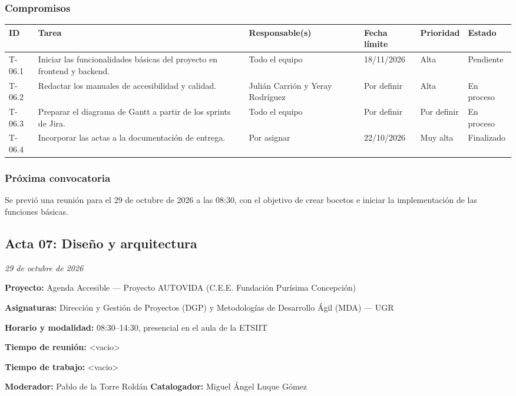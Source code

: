 \subsubsection{Compromisos}
\begin{center}\footnotesize
\begin{tabularx}{\textwidth}{@{}p{}X p{}p{}p{}p{}@{}}
\toprule
\rowcolor{tableHeader} ID & Tarea & Responsable(s) & Fecha límite & Prioridad & Estado \\
\midrule
T-06.1 & Iniciar las funcionalidades básicas del proyecto en frontend y backend. & Todo el equipo & 18/11/2026 & Alta & Pendiente \\
T-06.2 & Redactar los manuales de accesibilidad y calidad. & Julián Carrión y Yeray Rodríguez & Por definir & Alta & En proceso \\
T-06.3 & Preparar el diagrama de Gantt a partir de los sprints de Jira. & Todo el equipo & Por definir & Por definir & En proceso \\
T-06.4 & Incorporar las actas a la documentación de entrega. & Por asignar & 22/10/2026 & Muy alta & Finalizado \\
\bottomrule
\end{tabularx}
\end{center}

\subsubsection{Próxima convocatoria}
Se previó una reunión para el 29 de octubre de 2026 a las 08:30, con el objetivo de crear bocetos e iniciar la implementación de las funciones básicas.

\clearpage
\subsection{Acta 07: Diseño y arquitectura}
\textcolor{textGray}{\textit{29 de octubre de 2026}}

\begin{infobox}[title=Datos de la reunión]
\textbf{Proyecto:} Agenda Accesible --- Proyecto AUTOVIDA (C.E.E. Fundación Purísima Concepción)\par
\textbf{Asignaturas:} Dirección y Gestión de Proyectos (DGP) y Metodologías de Desarrollo Ágil (MDA) --- UGR\par
\textbf{Horario y modalidad:} 08:30--14:30, presencial en el aula de la ETSIIT\par
\textbf{Tiempo de reunión:} <vacio>\par
\textbf{Tiempo de trabajo:} <vacio>\par
\textbf{Moderador:} Pablo de la Torre Roldán\qquad
\textbf{Catalogador:} Miguel Ángel Luque Gómez
\end{infobox}

